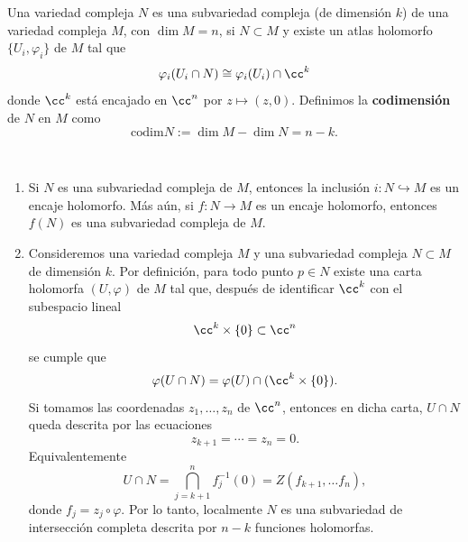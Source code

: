    
    \begin{definition}
        Una variedad compleja $N$ es una subvariedad compleja (de dimensión $k$) de una variedad compleja $M$, con $\dim M=n$, si $N\subset M$ y existe un atlas holomorfo $\{U_i,\varphi_i\}$ de $M$ tal que 
        \begin{equation*}
            \varphi_i(U_i\cap N)\cong \varphi_i(U_i)\cap\cc^k
        \end{equation*}
        donde $\cc^k$ está encajado en $\cc^n$ por $z\mapsto (z,0)$. Definimos la \textbf{codimensión} de $N$ en $M$ como
        \begin{equation*}
            \mathrm{codim}N:=\dim M-\dim N=n-k.
        \end{equation*}
    \end{definition}
    
    \begin{remark}\label{subvariedadesporecuaciones} $ $
    	\begin{enumerate}
    		\item Si $N$ es una subvariedad compleja de $M$, entonces la inclusión $i:N\hookrightarrow M$ es un encaje holomorfo. Más aún, si $f:N\to M$ es un encaje holomorfo, entonces $f(N)$ es una subvariedad compleja de $M$.
    		\item Consideremos una variedad compleja $M$ y una subvariedad compleja $N\subset M$ de dimensión $k$. Por definición, para todo punto $p\in N$ existe una carta holomorfa $(U,\varphi)$ de $M$ tal que, después de identificar $\cc^k$ con el subespacio lineal
    		\begin{equation*}
    			\cc^k\times\{0\}\subset\cc^n
    		\end{equation*}
    		se cumple que
    		\begin{equation*}
    			\varphi(U\cap N)=\varphi(U)\cap (\cc^k\times \{0\}).
    		\end{equation*}
    		Si tomamos las coordenadas $z_1,\dots,z_n$ de $\cc^n$, entonces en dicha carta, $U\cap N$ queda descrita por las ecuaciones 
    		\begin{equation*}
    			z_{k+1}=\cdots=z_n=0.
    		\end{equation*}
    		Equivalentemente
    		\begin{equation*}
    			U\cap N=\bigcap_{j=k+1}^n f_j^{-1}(0)=Z(f_{k+1},\dots f_n),
    		\end{equation*}
    		donde $f_j=z_j\circ \varphi$. Por lo tanto, localmente $N$ es una subvariedad de intersección completa descrita por $n-k$ funciones holomorfas.
    	\end{enumerate}
    \end{remark}

